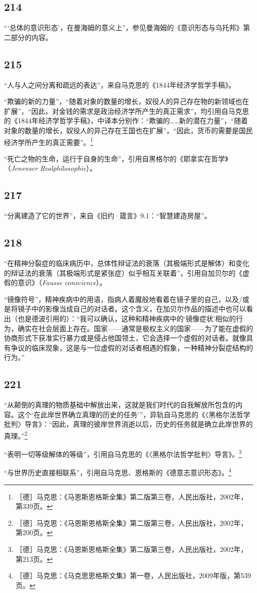 \documentclass[fontset=fandol, a4paper, 12pt, openright]{ctexbook}
\begin{document}
\subsection*{214}
“‘总体的意识形态’，在曼海姆的意义上”，参见曼海姆的《意识形态与乌托邦》第二部分的内容。

\subsection*{215}
“人与人之间分离和疏远的表达”，来自马克思的《1844年经济学哲学手稿》。

“欺骗的新的力量”，“随着对象的数量的增长，奴役人的异己存在物的新领域也在扩展”，“因此，对金钱的需求是政治经济学所产生的真正需求”，均引用自马克思的《1844年经济学哲学手稿》，中译本分别作：“欺骗的……新的潜在力量”，“随着对象的数量的增长，奴役人的异己存在王国也在扩展”，“因此，货币的需要是国民经济学所产生的真正需要”。\footnote{［德］马克思：《马恩斯恩格斯全集》第二版第三卷，人民出版社，2002年，第339页。}

“死亡之物的生命，运行于自身的生命”，引用自黑格尔的《耶拿实在哲学》（\textit{Jenenser Realphilosophie}）。

\subsection*{217}
“分离建造了它的世界”，来自《旧约·箴言》9.1：“智慧建造房屋”。

\subsection*{218}
“在精神分裂症的临床病历中，总体性辩证法的衰落（其极端形式是解体）和变化的辩证法的衰落（其极端形式是紧张症）似乎相互关联着”，引用自加贝尔的《虚假的意识》（\textit{Fausse conscience}）。

“镜像符号”，精神疾病中的用语，指病人着魔般地看着在镜子里的自己，以及/或是将镜子中的影像当成自己的对话者。这个含义，在加贝尔作品的描述中也可以看出（也是德波引用的）：“我可以确认，这种和精神疾病中的‘镜像症状’相似的行为，确实在社会层面上存在。国家——通常是极权主义的国家——为了能在虚假的协商形式下获准实行暴力或是侵占他国领土，它会选择一个虚假的对话者。就像具有争议的临床现象，这是与一位虚假的对话者相遇的假象，一种精神分裂症结构的行为。”

\subsection*{221}
“从颠倒的真理的物质基础中解放出来，这就是我们时代的自我解放所包含的内容。这个‘在此岸世界确立真理的历史的任务’”，异轨自马克思的《〈黑格尔法哲学批判〉导言》：“因此，真理的彼岸世界消逝以后，历史的任务就是确立此岸世界的真理。”\footnote{［德］马克思：《马恩斯恩格斯全集》第二版第三卷，人民出版社，2002年，第200页。}

“表明一切等级解体的等级”，引用自马克思的《〈黑格尔法哲学批判〉导言》。\footnote{［德］马克思：《马恩斯恩格斯全集》第二版第三卷，人民出版社，2002年，第213页。}

“与世界历史直接相联系”，引用自马克思、恩格斯的《德意志意识形态》。\footnote{［德］马克思：《马克思恩格斯文集》第一卷，人民出版社，2009年版，第539页。}
\end{document}
